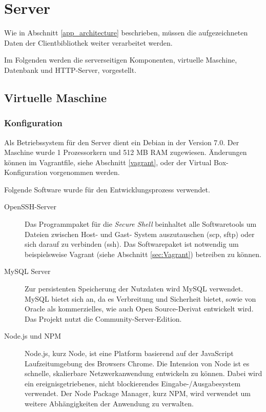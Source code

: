 \section{Server}
\label{server}
Wie in Abschnitt \ref{app_architecture} beschrieben, müssen die aufgezeichneten Daten der Clientbibliothek weiter verarbeitet werden. %

Im Folgenden werden die serverseitigen Komponenten, virtuelle Maschine, Datenbank und HTTP-Server, vorgestellt. 



\subsection{Virtuelle Maschine}

\subsubsection{Konfiguration}

Als Betriebssystem für den Server dient ein Debian in der Version 7.0. Der Maschine wurde 1 Prozessorkern und 512 MB RAM zugewiesen. Änderungen können im Vagrantfile, siehe Abschnitt \ref{vagrant}, oder der Virtual Box-Konfiguration vorgenommen werden. 

Folgende Software wurde für den Entwicklungsprozess verwendet. 
\begin{description}
	\item[OpenSSH-Server\footnotemark] 
Das Programmpaket für die \emph{Secure Shell} beinhaltet alle Softwaretools um Dateien zwischen Host- und Gast- System auszutauschen (scp, sftp) oder sich darauf zu verbinden (ssh). Das Softwarepaket ist notwendig um beispielsweise Vagrant (siehe Abschnitt \ref{sec:Vagrant}) betreiben zu können. 

	\item[MySQL Server\footnotemark]
Zur persistenten Speicherung der Nutzdaten wird MySQL verwendet. MySQL bietet sich an, da es Verbreitung und Sicherheit bietet, sowie von Oracle als kommerzielles, wie auch Open Source-Derivat entwickelt wird. Das Projekt nutzt die Community-Server-Edition.
	
	\item[Node.js und NPM\footnotemark]
Node.js, kurz Node, ist eine Platform basierend auf der JavaScript Laufzeitumgebung des Browsers Chrome. Die Intension von Node ist es schnelle, skalierbare Netzwerkanwendung entwickeln zu können. Dabei wird ein ereignisgetriebenes, nicht blockierendes Eingabe-/Ausgabesystem verwendet. Der Node Package Manager, kurz NPM, wird verwendet um weitere Abhängigkeiten der Anwendung zu verwalten.
	
\end{description}

